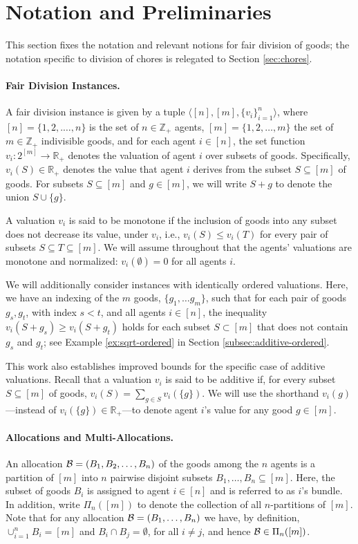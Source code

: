\section{Notation and Preliminaries}\label{sec:prelims}
This section fixes the notation and relevant notions for fair division of goods; the notation specific to division of chores is relegated to Section \ref{sec:chores}. 
 
\paragraph{Fair Division Instances.} A {fair division instance} is given by a tuple $\langle [n], [m], \{v_i\}_{i=1}^n \rangle$, where $[n]=\{1,2,.\dots,n\}$ is the set of $n\in\mathbb{Z}_+$ agents, $[m]=\{1,2, \dots, m\}$ the set of $m\in \mathbb{Z}_+$ indivisible goods, and for each agent $i\in[n]$, the set function $v_i: 2^{[m]} \to \mathbb{R}_+$ denotes the valuation of agent $i$ over subsets of goods. Specifically, $v_i(S) \in \mathbb{R}_+$ denotes the value that agent $i$ derives from the subset $S \subseteq [m]$ of goods. For subsets $S \subseteq [m]$ and $g \in [m]$, we will write $S + g$ to denote the union $S \cup \{ g\}$. 

A valuation $v_i$ is said to be monotone if the inclusion of goods into any subset does not decrease its value, under $v_i$, i.e., $v_i(S)\leq v_i(T)$ for every pair of subsets $S \subseteq T \subseteq[m]$. We will assume throughout that the agents' valuations are monotone and normalized: $v_i(\emptyset)=0$ for all agents $i$. 

We will additionally consider instances with identically ordered valuations. Here, we have an indexing of the $m$ goods, $\{g_1, \ldots g_m\}$, such that for each pair of goods $g_s, g_t$, with index $s < t$, and all agents $i \in [n]$, the inequality $v_i(S + g_s) \geq  v_i(S + g_t)$ holds for each subset $S \subset [m]$ that does not contain $g_s$ and $g_t$; see Example \ref{ex:sqrt-ordered} in Section \ref{subsec:additive-ordered}. 

This work also establishes improved bounds for the specific case of additive valuations. Recall that a valuation $v_i$ is said to be additive if, for every subset $S\subseteq[m]$ of goods, $v_i(S)=\sum_{g\in S} v_i(\{g\})$. We will use the shorthand $v_i(g)$---instead of $v_i(\{g\}) \in \mathbb{R}_+$---to denote agent $i$'s value for any good $g \in [m]$.  


\paragraph{Allocations and Multi-Allocations.} An allocation $\mathcal{B}=(B_1,B_2,\ldots, B_n)$ of the goods among the $n$ agents is a partition of $[m]$ into $n$ pairwise disjoint subsets $B_1,\ldots, B_n \subseteq [m]$. Here, the subset of goods $B_i$ is assigned to agent $i \in [n]$ and is referred to as $i$'s bundle. In addition, write $\Pi_n([m])$ to denote the collection of all $n$-partitions of $[m]$. Note that for any allocation $\mathcal{B} =(B_1,\ldots, B_n)$ we have, by definition, $\cup_{i=1}^n B_i = [m]$ and $B_i \cap B_j = \emptyset$, for all $i \neq j$, and hence $\mathcal{B} \in \Pi_n([m])$.

